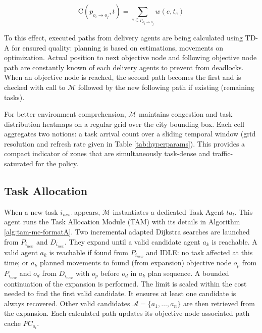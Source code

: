 \documentclass[sigconf]{acmart}
\begin{document}
\begin{equation}
\text{C}(p_{o_i \to o_j}, t) = \sum_{e \in p_{o_i \to o_j}} w(e, t_e)
\label{eq:path_cache_path_cost}
\end{equation}

To this effect, executed paths from delivery agents are being calculated using TD-A\* for ensured quality: planning is based on estimations, movements on optimization. Actual position to next objective node and following objective node path are constantly known of each delivery agents to prevent from deadlocks. When an objective node is reached, the second path becomes the first and is checked with call to $\mathcal{M}$ followed by the new following path if existing (remaining tasks).

For better environment comprehension, $\mathcal{M}$ maintains congestion and task distribution heatmaps on a regular grid over the city bounding box. Each cell aggregates two notions: a task arrival count over a sliding temporal window (grid resolution and refresh rate given in Table \ref{tab:hyperparams}). This provides a compact indicator of zones that are simultaneously task-dense and traffic-saturated for the policy.

\subsection{Task Allocation}

When a new task $i_{new}$ appears, $\mathcal{M}$ instantiates a dedicated Task Agent $ta_l$. This agent runs the Task Allocation Module (TAM) with its details in Algorithm \ref{alg:tam-mc-formatA}. Two incremental adapted Dijkstra searches are launched from $P_{i_{new}}$ and $D_{i_{new}}$. They expand until a valid candidate agent $a_k$ is reachable. A valid agent $a_k$ is reachable if found from $P_{i_{new}}$ and IDLE: no task affected at this time; or $a_k$ planned movements to found (from expansion) objective node $o_p$ from $P_{i_{new}}$ and $o_d$ from $D_{i_{new}}$ with $o_p$ before $o_d$ in $a_k$ plan sequence. A bounded continuation of the expansion is performed. The limit is scaled within the cost needed to find the first valid candidate. It ensures at least one candidate is always recovered. Other valid candidates $\mathcal{A}=\{a_1, \dots,a_n\}$ are then retrieved from the expansion. Each calculated path updates its objective node associated path cache $PC_{o_i}$.
\end{document}
